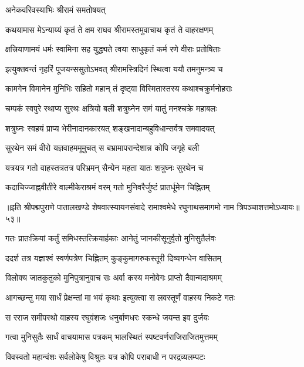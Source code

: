 अनेकवरिवस्याभिः श्रीरामं समतोषयत्

\twolineshloka
{कथयामास मेऽन्याय्यं कृतं ते क्षम राघव}
{श्रीरामस्तमुवाचाथ कृतं ते वाहरक्षणम्}%

\twolineshloka
{क्षत्त्रियाणामयं धर्मः स्वामिना सह युद्ध्यते}
{त्वया साधुकृतं कर्म रणे वीराः प्रतोषिताः}%

\twolineshloka
{इत्युक्तवन्तं नृहरिं पूजयन्ससुतोऽभवत्}
{श्रीरामस्त्रिदिनं स्थित्वा ययौ तमनुमन्त्र्य च}%

\twolineshloka
{कामगेन विमानेन मुनिभिः सहितो महान्}
{तं दृष्ट्वा विस्मितास्तस्य कथाश्चक्रुर्मनोहराः}%

\twolineshloka
{चम्पकं स्वपुरे स्थाप्य सुरथः क्षत्रियो बली}
{शत्रुघ्नेन समं यातुं मनश्चक्रे महाबलः}%

\twolineshloka
{शत्रुघ्नः स्वहयं प्राप्य भेरीनादानकारयत्}
{शङ्खनादान्बहुविधान्सर्वत्र समवादयत्}%

\twolineshloka
{सुरथेन समं वीरो यज्ञवाहममूमुचत्}
{स बभ्रामापरान्देशान्न कोपि जगृहे बली}%

\twolineshloka
{यत्रयत्र गतो वाहस्तत्रतत्र परिभ्रमन्}
{सैन्येन महता यातः शत्रुघ्नः सुरथेन च}%

\twolineshloka
{कदाचिज्जाह्नवीतीरे वाल्मीकेराश्रमं वरम्}
{गतो मुनिवरैर्जुष्टं प्रातर्धूमेन चिह्नितम्}%

॥इति श्रीपद्मपुराणे पातालखण्डे शेषवात्स्यायनसंवादे रामाश्वमेधे रघुनाथसमागमो नाम त्रिपञ्चाशत्तमोऽध्यायः॥५३॥



\twolineshloka
{गतः प्रातःक्रियां कर्तुं समिधस्तत्क्रियार्हकाः}
{आनेतुं जानकीसूनुर्वृतो मुनिसुतैर्लवः}%

\twolineshloka
{ददर्श तत्र यज्ञाश्वं स्वर्णपत्रेण चिह्नितम्}
{कुङ्कुमागरुकस्तूरी दिव्यगन्धेन वासितम्}%

\twolineshloka
{विलोक्य जातकुतुको मुनिपुत्रानुवाच सः}
{अर्वा कस्य मनोवेगः प्राप्तो दैवान्मदाश्रमम्}%

\twolineshloka
{आगच्छन्तु मया सार्धं प्रेक्षन्तां मा भयं कृथाः}
{इत्युक्त्वा स लवस्तूर्णं वाहस्य निकटे गतः}%

\twolineshloka
{स रराज समीपस्थो वाहस्य रघुवंशजः}
{धनुर्बाणधरः स्कन्धे जयन्त इव दुर्जयः}%

\twolineshloka
{गत्वा मुनिसुतैः सार्धं वाचयामास पत्रकम्}
{भालस्थितं स्पष्टवर्णराजिराजितमुत्तमम्}%

\twolineshloka
{विवस्वतो महान्वंशः सर्वलोकेषु विश्रुतः}
{यत्र कोपि पराबाधी न परद्रव्यलम्पटः}%

